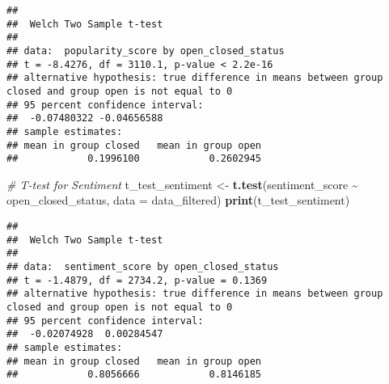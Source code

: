 \documentclass[
]{article}
\newenvironment{Shaded}{\begin{snugshade}}{\end{snugshade}}
\newcommand{\AttributeTok}[1]{\textcolor[rgb]{0.13,0.29,0.53}{#1}}
\newcommand{\CommentTok}[1]{\textcolor[rgb]{0.56,0.35,0.01}{\textit{#1}}}
\newcommand{\FunctionTok}[1]{\textcolor[rgb]{0.13,0.29,0.53}{\textbf{#1}}}
\newcommand{\NormalTok}[1]{#1}
\newcommand{\OtherTok}[1]{\textcolor[rgb]{0.56,0.35,0.01}{#1}}
\newcommand{\SpecialCharTok}[1]{\textcolor[rgb]{0.81,0.36,0.00}{\textbf{#1}}}
\begin{document}
\begin{verbatim}
## 
##  Welch Two Sample t-test
## 
## data:  popularity_score by open_closed_status
## t = -8.4276, df = 3110.1, p-value < 2.2e-16
## alternative hypothesis: true difference in means between group closed and group open is not equal to 0
## 95 percent confidence interval:
##  -0.07480322 -0.04656588
## sample estimates:
## mean in group closed   mean in group open 
##            0.1996100            0.2602945
\end{verbatim}

\begin{Shaded}
\begin{Highlighting}[]
\CommentTok{\# T{-}test for Sentiment}
\NormalTok{t\_test\_sentiment }\OtherTok{\textless{}{-}} \FunctionTok{t.test}\NormalTok{(sentiment\_score }\SpecialCharTok{\textasciitilde{}}\NormalTok{ open\_closed\_status, }\AttributeTok{data =}\NormalTok{ data\_filtered)}
\FunctionTok{print}\NormalTok{(t\_test\_sentiment)}
\end{Highlighting}
\end{Shaded}

\begin{verbatim}
## 
##  Welch Two Sample t-test
## 
## data:  sentiment_score by open_closed_status
## t = -1.4879, df = 2734.2, p-value = 0.1369
## alternative hypothesis: true difference in means between group closed and group open is not equal to 0
## 95 percent confidence interval:
##  -0.02074928  0.00284547
## sample estimates:
## mean in group closed   mean in group open 
##            0.8056666            0.8146185
\end{verbatim}
\end{document}
